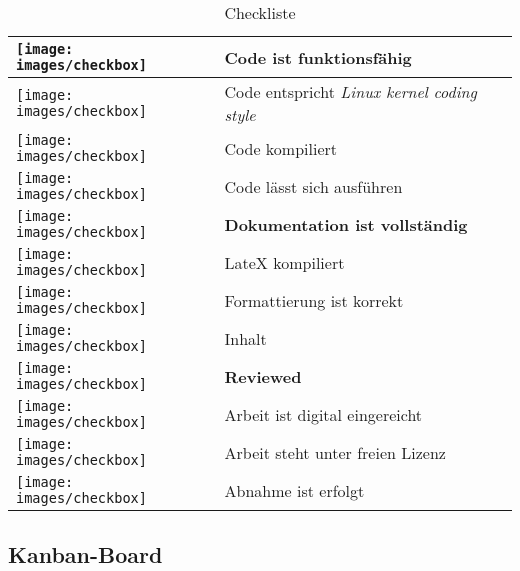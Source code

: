 \begin{table}[h!]
\begin{center}
   \small
   \begin{tabular}{| p{0.5cm} | p{8cm} |} \hline
      \texttt{[image: images/checkbox]} & \textbf{Code ist funktionsfähig} \\ \hline
      \texttt{[image: images/checkbox]} & \hspace{0.5cm} Code entspricht \emph{Linux kernel coding style} \\ \hline
      \texttt{[image: images/checkbox]} & \hspace{0.5cm} Code kompiliert \\ \hline
      \texttt{[image: images/checkbox]} & \hspace{0.5cm} Code lässt sich ausführen \\ \hline

      \texttt{[image: images/checkbox]} & \textbf{Dokumentation ist vollständig} \\ \hline
      \texttt{[image: images/checkbox]} & \hspace{0.5cm} LateX kompiliert \\ \hline
      \texttt{[image: images/checkbox]} & \hspace{0.5cm} Formattierung ist korrekt \\ \hline
      \texttt{[image: images/checkbox]} & \hspace{0.5cm} Inhalt  \\ \hline

      \texttt{[image: images/checkbox]} & \textbf{Reviewed} \\ \hline
      \texttt{[image: images/checkbox]} & \hspace{0.5cm} Arbeit ist digital eingereicht \\ \hline
      \texttt{[image: images/checkbox]} & \hspace{0.5cm} Arbeit steht unter freien Lizenz \\ \hline
      \texttt{[image: images/checkbox]} & \hspace{0.5cm} Abnahme ist erfolgt \\ \hline
   \end{tabular}
   \caption[Definition of Done - Checkliste]{Checkliste}
   \label{tab:dod}
\end{center}
\end{table}


\subsection{Kanban-Board}

